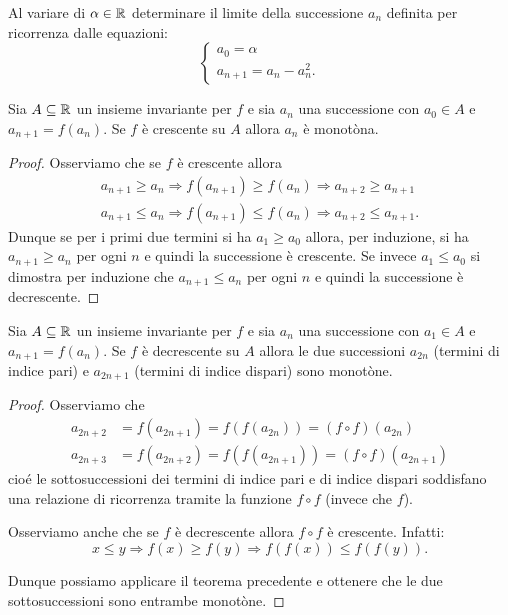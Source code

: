 \begin{exercise}
Al variare di $\alpha \in {\mathbb R}$
determinare il limite della successione $a_n$ definita per ricorrenza dalle
equazioni:
\[
\begin{cases}
 a_0 = \alpha \\
 a_{n+1} = a_n - a_n^2.
\end{cases}
\]
\end{exercise}

\begin{theorem}
\mymark{**}%
  Sia $A\subseteq {\mathbb R}$ un insieme invariante per $f$ e sia $a_n$ una successione
  con $a_0\in A$ e $a_{n+1} = f(a_n)$. Se $f$ è crescente
  su $A$ allora $a_n$
  è monotòna.
\end{theorem}
\begin{proof}
\mymark{**}%
  Osserviamo che se $f$ è crescente allora
  \begin{align*}
    a_{n+1} \ge a_n \Rightarrow f(a_{n+1}) \ge f(a_n) \Rightarrow
    a_{n+2} \ge a_{n+1}\\
    a_{n+1} \le a_n \Rightarrow f(a_{n+1}) \le f(a_n) \Rightarrow a_{n+2} \le a_{n+1}.
  \end{align*}
  Dunque se per i primi due termini si ha $a_1 \ge a_0$ allora, per
  induzione, si ha $a_{n+1} \ge a_n$ per ogni $n$ e quindi la
  successione è crescente. Se invece $a_1 \le a_0$ si dimostra per
  induzione che $a_{n+1} \le a_n$ per ogni $n$ e quindi la successione
  è decrescente.
\end{proof}

\begin{theorem}\label{th_decr}%
\mymark{**}%
  Sia $A\subseteq {\mathbb R}$ un insieme invariante per $f$ e sia $a_n$ una successione
  con $a_1\in A$ e $a_{n+1} = f(a_n)$. Se $f$ è decrescente
  su $A$
  allora le due successioni $a_{2n}$ (termini di indice pari) e
  $a_{2n+1}$ (termini di indice dispari) sono monotòne.
\end{theorem}
\begin{proof}
\mymark{**}%
  Osserviamo che
  \begin{align*}
    a_{2n+2} &= f(a_{2n+1}) = f(f(a_{2n})) = (f\circ f)(a_{2n})\\
    a_{2n+3} &= f(a_{2n+2}) = f(f(a_{2n+1})) = (f\circ f)(a_{2n+1})
  \end{align*}
cioé le sottosuccessioni dei termini di indice pari e di indice
dispari soddisfano una relazione di ricorrenza tramite la funzione
$f\circ f$ (invece che $f$).

Osserviamo anche che se $f$ è decrescente allora $f\circ f$ è
crescente. Infatti:
\[
x \le y \Rightarrow f(x) \ge f(y) \Rightarrow f(f(x)) \le f(f(y)).
\]

Dunque possiamo applicare il teorema precedente e ottenere che le due
sottosuccessioni sono entrambe monotòne.
\end{proof}

